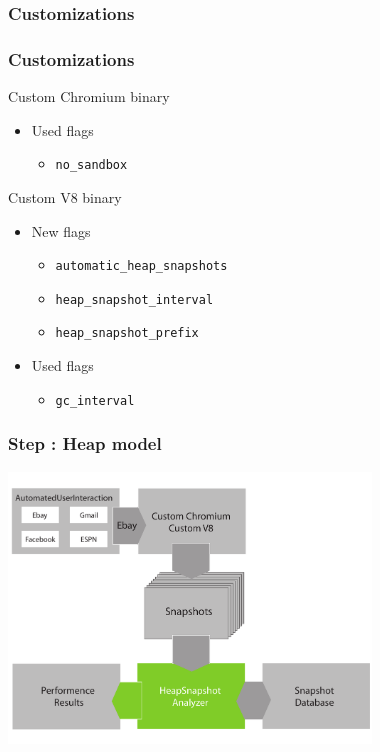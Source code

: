 \subsubsection{Customizations}
\begin{frame}
	\frametitle{Customizations}
			Custom Chromium binary
			\begin{itemize}
				\item Used flags
				\begin{itemize}
					\item \texttt{no\_sandbox} 						%
				\end{itemize}
			\end{itemize}
			
			Custom V8 binary
			\begin{itemize}
				\item New flags
				\begin{itemize}
					\item \texttt{automatic\_heap\_snapshots} 		%
					\item \texttt{heap\_snapshot\_interval} 		%
					\item \texttt{heap\_snapshot\_prefix} 			%
				\end{itemize}
				\item Used flags
				\begin{itemize}
					\item \texttt{gc\_interval} 					%
				\end{itemize}
			\end{itemize}
\end{frame}
	
\begin{frame}
	\frametitle{Step \theStepCounter: Heap model}		
	\includegraphics[width=26em]{../imgs/solution_h_3.pdf}
\end{frame}
	

